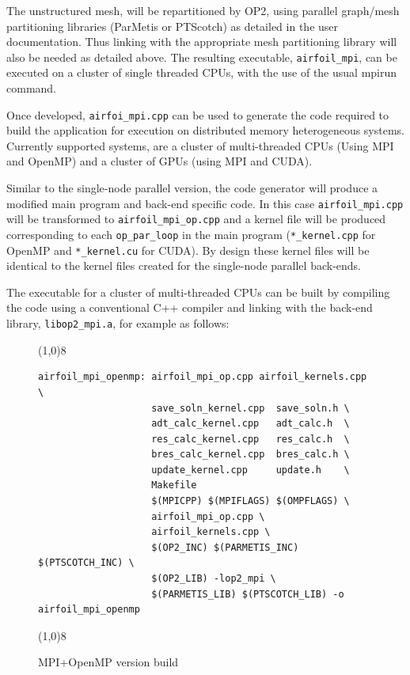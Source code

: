 \documentclass[11pt]{article}
\begin{document}
\noindent The unstructured mesh, will be repartitioned by OP2, using parallel graph/mesh partitioning libraries
(ParMetis or PTScotch) as detailed in the user documentation. Thus linking with the appropriate mesh partitioning
library will also be needed as detailed above. The resulting executable, \texttt{airfoil\_mpi}, can be executed on a
cluster of single threaded CPUs, with the use of the usual mpirun command. 

\newpage

Once developed, \texttt{airfoi\_mpi.cpp} can be used to generate the code required to build the application for
execution on distributed memory heterogeneous systems. Currently supported systems, are a cluster of multi-threaded CPUs
(Using MPI and OpenMP) and a cluster of GPUs (using MPI and CUDA).

Similar to the single-node parallel version, the code generator will produce a modified main program and back-end
specific code. In this case \texttt{airfoil\_mpi.cpp} will be transformed to \texttt{airfoil\_mpi\_op.cpp} and a kernel
file will be produced corresponding to each \texttt{op\_par\_loop} in the main program (\texttt{*\_kernel.cpp} for
OpenMP and \texttt{*\_kernel.cu} for CUDA). By design these kernel files will be identical to the kernel files created
for the single-node parallel back-ends. 

\noindent The executable for a cluster of multi-threaded CPUs can be built by compiling the code using a conventional
C++ compiler and linking with the back-end library, \texttt{libop2\_mpi.a}, for example as follows:

\begin{figure}[!h]\small
\vspace{-0pt}\noindent\line(1,0){8}\vspace{-10pt}
\begin{lstlisting}
airfoil_mpi_openmp: airfoil_mpi_op.cpp airfoil_kernels.cpp \
                    save_soln_kernel.cpp  save_soln.h \
                    adt_calc_kernel.cpp   adt_calc.h  \
                    res_calc_kernel.cpp   res_calc.h  \
                    bres_calc_kernel.cpp  bres_calc.h \
                    update_kernel.cpp     update.h    \
                    Makefile
                    $(MPICPP) $(MPIFLAGS) $(OMPFLAGS) \
                    airfoil_mpi_op.cpp \
                    airfoil_kernels.cpp \
                    $(OP2_INC) $(PARMETIS_INC) $(PTSCOTCH_INC) \
                    $(OP2_LIB) -lop2_mpi \
                    $(PARMETIS_LIB) $(PTSCOTCH_LIB) -o airfoil_mpi_openmp
\end{lstlisting}\vspace{-10pt}
\vspace{-0pt}\noindent\line(1,0){8}\vspace{-10pt}
\caption{\small MPI+OpenMP version build }
\normalsize\vspace{-10pt}\label{fig:mpi_openmpbuild}
\end{figure}
\end{document}
